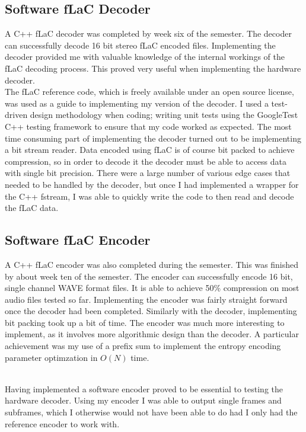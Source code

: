 \documentclass[12pt]{scrartcl}
\begin{document}
  \subsection{Software fLaC Decoder}
  A C++ fLaC decoder was completed by week six of the semester. The decoder can successfully decode 16 bit stereo fLaC encoded files. Implementing the decoder provided me with valuable knowledge of the internal workings of the fLaC decoding process. This proved very useful when implementing the hardware decoder. \\
  
  The fLaC reference code, which is freely available under an open source license, was used as a guide to implementing my version of the decoder. I used a test-driven design methodology when coding; writing unit tests using the GoogleTest C++ testing framework to ensure that my code worked as expected. The most time consuming part of implementing the decoder turned out to be implementing a bit stream reader. Data encoded using fLaC is of course bit packed to achieve compression, so in order to decode it the decoder must be able to access data with single bit precision. There were a large number of various edge cases that needed to be handled by the decoder, but once I had implemented a wrapper for the C++ fstream, I was able to quickly write the code to then read and decode the fLaC data.
  
  \subsection{Software fLaC Encoder}
  A C++ fLaC encoder was also completed during the semester. This was finished by about week ten of the semester. The encoder can successfully encode 16 bit, single channel WAVE format files. It is able to achieve 50\% compression on most audio files tested so far. Implementing the encoder was fairly straight forward once the decoder had been completed. Similarly with the decoder, implementing bit packing took up a bit of time. The encoder was much more interesting to implement, as it involves more algorithmic design than the decoder. A particular achievement was my use of a prefix sum to implement the entropy encoding parameter optimzation in \(O(N)\) time. \\\
  
  Having implemented a software encoder proved to be essential to testing the hardware decoder. Using my encoder I was able to output single frames and subframes, which I otherwise would not have been able to do had I only had the reference encoder to work with.
  
\end{document}
